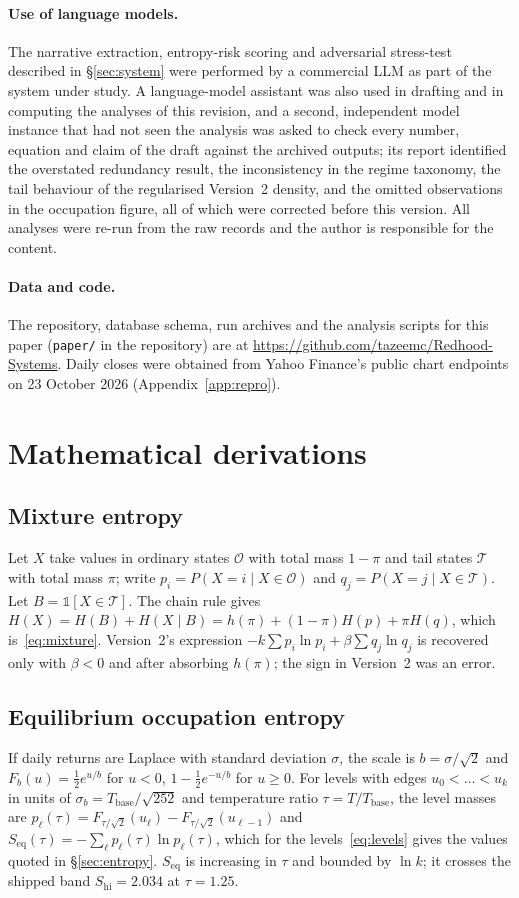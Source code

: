 \documentclass[11pt]{article}
\newcommand{\Tb}{T_{\mathrm{base}}}
\begin{document}
\paragraph{Use of language models.} The narrative extraction, entropy-risk scoring and adversarial stress-test described in \S\ref{sec:system} were performed by a commercial LLM as part of the system under study. A language-model assistant was also used in drafting and in computing the analyses of this revision, and a second, independent model instance that had not seen the analysis was asked to check every number, equation and claim of the draft against the archived outputs; its report identified the overstated redundancy result, the inconsistency in the regime taxonomy, the tail behaviour of the regularised Version~2 density, and the omitted observations in the occupation figure, all of which were corrected before this version. All analyses were re-run from the raw records and the author is responsible for the content.
\paragraph{Data and code.} The repository, database schema, run archives and the analysis scripts for this paper (\texttt{paper/} in the repository) are at \url{https://github.com/tazeemc/Redhood-Systems}. Daily closes were obtained from Yahoo Finance's public chart endpoints on 23 October 2026 (Appendix~\ref{app:repro}).

\appendix
\section{Mathematical derivations}\label{app:deriv}
\subsection{Mixture entropy}
Let $X$ take values in ordinary states $\mathcal O$ with total mass $1-\pi$ and tail states $\mathcal T$ with total mass $\pi$; write $p_i=P(X=i\mid X\in\mathcal O)$ and $q_j=P(X=j\mid X\in\mathcal T)$. Let $B=\mathbb 1[X\in\mathcal T]$. The chain rule gives $H(X)=H(B)+H(X\mid B)=h(\pi)+(1-\pi)H(p)+\pi H(q)$, which is~\eqref{eq:mixture}. Version~2's expression $-k\sum p_i\ln p_i+\beta\sum q_j\ln q_j$ is recovered only with $\beta<0$ and after absorbing $h(\pi)$; the sign in Version~2 was an error.
\subsection{Equilibrium occupation entropy}
If daily returns are Laplace with standard deviation $\sigma$, the scale is $b=\sigma/\sqrt2$ and $F_b(u)=\tfrac12e^{u/b}$ for $u<0$, $1-\tfrac12e^{-u/b}$ for $u\ge0$. For levels with edges $u_0<\dots<u_k$ in units of $\sigma_b=\Tb/\sqrt{252}$ and temperature ratio $\tau=T/\Tb$, the level masses are $p_\ell(\tau)=F_{\tau/\sqrt2}(u_\ell)-F_{\tau/\sqrt2}(u_{\ell-1})$ and $S_{\mathrm{eq}}(\tau)=-\sum_\ell p_\ell(\tau)\ln p_\ell(\tau)$, which for the levels~\eqref{eq:levels} gives the values quoted in \S\ref{sec:entropy}. $S_{\mathrm{eq}}$ is increasing in $\tau$ and bounded by $\ln k$; it crosses the shipped band $S_{\mathrm{hi}}=2.034$ at $\tau=1.25$.
\end{document}
